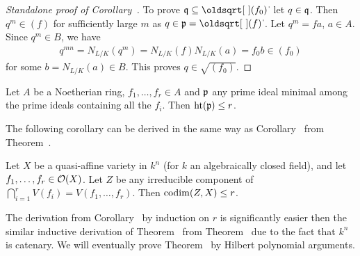 \documentclass[a4paper,parskip=half,numbers=enddot, DIV=12]{scrreprt}
\begin{document}
\begin{proof}[Standalone proof of Corollary~]
	To prove $\qq\subseteq\sqrt{(f_0)}$ let $q\in\mathfrak{q}$. Then $q^m\in (f)$ for sufficiently large $m$ as $q\in\pp=\sqrt{(f)}$. Let $q^m=fa$, $a\in A$. Since $q^m\in B$, we have 
	\begin{align*}
		q^{mn}=N_{L/K}(q^m)=N_{L/K}(f)N_{L/K}(a)=f_0b\in(f_0)
	\end{align*}
	for some $b=N_{L/K}(a)\in B$. This proves $q\in\sqrt{(f_0)}$.
\end{proof}
\begin{thm}
    Let $A$ be a Noetherian ring, $f_1,\ldots,f_r\in A$ and $\mathfrak{p}$ any prime ideal minimal among the prime ideals containing all the $f_i$. Then $\operatorname{ht}(\mathfrak{p})\leq r$.
\end{thm}    
The following corollary can be derived in the same way as Corollary~ from Theorem~.
\begin{cor}
    Let $X$ be a quasi-affine variety in $k^n$ (for $k$ an algebraically closed field), and let $f_1,\ldots,f_r\in \mathcal{O}(X)$. Let $Z$ be any irreducible component of $\bigcap_{i=1}^r V(f_i)=V(f_1,\ldots,f_r)$. Then $\operatorname{codim}(Z,X)\leq r$.
\end{cor}
The derivation from Corollary~ by induction on $r$ is significantly easier then the similar inductive derivation of Theorem~ from Theorem~ due to the fact that $k^n$ is catenary. We will eventually prove Theorem~ by Hilbert polynomial arguments.
\end{document}
